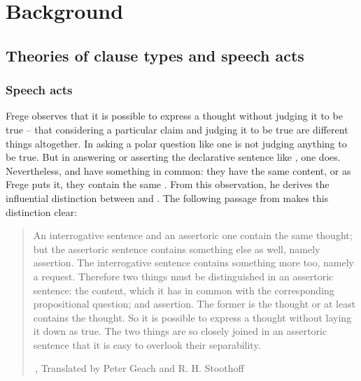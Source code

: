 \chapter{Background}
\label{chap:background}


\section{Theories of clause types and speech acts} \label{sec:bg:theory}


\subsection{Speech acts} \label{sec:bg:theory:speech}

Frege observes that it is possible to express a thought without judging it to be true -- that considering a particular claim and judging it to be true are different things altogether. In asking a polar question like  one is not judging anything to be true. But in answering or asserting the declarative sentence like , one does. Nevertheless,  and  have something in common: they have the same content, or as Frege puts it, they contain the same . From this observation, he derives the influential distinction between  and . The following passage from  makes this distinction clear:

\begin{quote}
    

An interrogative sentence and an assertoric one contain the same thought; but the assertoric sentence contains something else as well, namely assertion. The interrogative sentence contains something more too, namely a request. Therefore two things must be distinguished in an assertoric sentence: the content, which it has in common with the corresponding propositional question; and assertion. The former is the thought or at least contains the thought. So it is possible to express a thought without laying it down as true. The two things are so closely joined in an assertoric sentence that it is easy to overlook their separability. 

$\,$\hfill \cite[62]{frege1918thought}, Translated by Peter Geach and R. H. Stoothoff
\end{quote}


